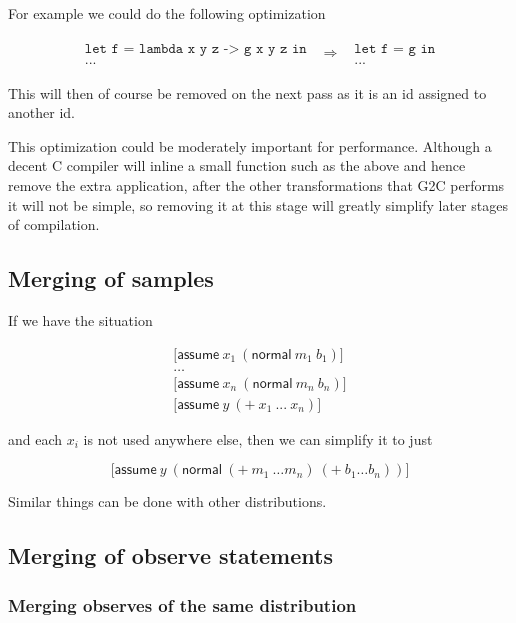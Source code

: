 \documentclass[a4paper]{article}
\newcommand{\optimization}[2]{
	\[
		\begin{array}{rcl}
			#1 & \Rightarrow & #2
		\end{array}
	\]
}
\begin{document}
For example we could do the following optimization

\optimization{
	\begin{array}{l}
		\texttt{let f = lambda x y z -> g x y z in} \\
		\texttt{...}
	\end{array}
}{
	\begin{array}{l}
		\texttt{let f = g in} \\
		\texttt{...}
	\end{array}
}

This will then of course be removed on the next pass as it is an id assigned to another id.

This optimization could be moderately important for performance. Although a decent C compiler will inline a small function such as the above and hence remove the extra application, after the other transformations that G2C performs it will not be simple, so removing it at this stage will greatly simplify later stages of compilation.



\subsection{Merging of samples}

If we have the situation

\[
	\begin{array}{l}
		\lbrack \mathsf{assume}\ x_1\ (\mathsf{normal}\ m_1\ b_1) \rbrack \\
		\dots \\
		\lbrack \mathsf{assume}\ x_n\ (\mathsf{normal}\ m_n\ b_n) \rbrack \\
		\lbrack \mathsf{assume}\ y\ (+\ x_1\ ...\ x_n) \rbrack
	\end{array}
\]

and each \(x_i\) is not used anywhere else, then we can simplify it to just

\[\lbrack \mathsf{assume}\ y\ (\mathsf{normal}\ (+\ m_1\ \dots m_n)\ (+\ b_1 \dots b_n)) \rbrack\]

Similar things can be done with other distributions.



\subsection{Merging of observe statements}

\subsubsection{Merging observes of the same distribution}
\end{document}
